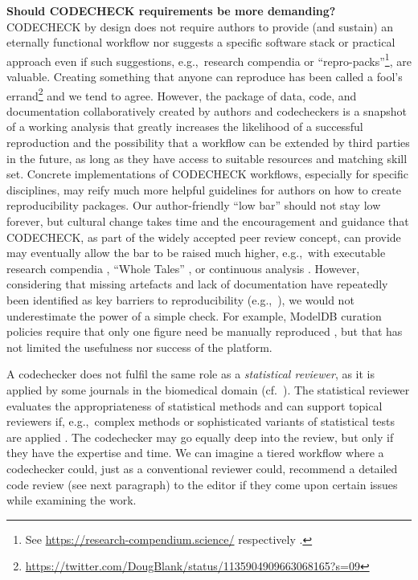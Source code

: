 \documentclass[12pt]{article}
\begin{document}
\textbf{Should CODECHECK requirements be more demanding?} \\
CODECHECK by design does not require authors to provide (and sustain)
an eternally functional workflow nor suggests a specific software
stack or practical approach even if such suggestions, e.g.,~research
compendia or ``repro-packs''\footnote{See
  \url{https://research-compendium.science/} respectively
  \cite{barba_praxis_2018}.}, are valuable.  Creating something
that anyone can reproduce has been called a fool's
errand\footnote{\url{https://twitter.com/DougBlank/status/1135904909663068165?s=09}}
and we tend to agree.  However, the package of data, code, and
documentation collaboratively created by authors and codecheckers is a
snapshot of a working analysis that greatly increases the likelihood
of a successful reproduction and the possibility that a workflow can
be extended by third parties in the future, as long as they have
access to suitable resources and matching skill set.  Concrete
implementations of CODECHECK workflows, especially for specific
disciplines, may reify much more helpful guidelines for authors on how
to create reproducibility packages.  Our author-friendly ``low bar''
should not stay low forever, but cultural change takes time and the
encouragement and guidance that CODECHECK, as part of the widely
accepted peer review concept, can provide may eventually allow the bar
to be raised much higher, e.g.,~with executable research
compendia \cite{nust_opening_2017}, ``Whole Tales''
\cite{brinckman_computing_2018}, or continuous analysis
\cite{beaulieu-jones_reproducibility_2017-1}.  However, considering
that missing artefacts and lack of documentation have repeatedly been
identified as key barriers to reproducibility
(e.g.,~\cite{stagge_assessing_2019,nust_improving_2020}), we would not
underestimate the power of a simple check.  For example, ModelDB
curation policies require that only one figure need be manually reproduced
\cite{mcdougal_reproducibility_2016}, but that has not limited the
usefulness nor success of the platform.

A codechecker does not fulfil the same role as a \emph{statistical
  reviewer}, as it is applied by some journals in the biomedical
domain (cf.~\cite{petrovecki_role_2009,greenwood_how_2015}).  The
statistical reviewer evaluates the appropriateness of statistical
methods \cite{greenwood_how_2015} and can support topical reviewers
if, e.g.,~complex methods or sophisticated variants of statistical
tests are applied \cite{petrovecki_role_2009}.  The codechecker may go
equally deep into the review, but only if they have the expertise and
time. We can imagine a tiered workflow where a codechecker could, just
as a conventional reviewer could, recommend a detailed code review
(see next paragraph) to the editor if they come upon certain issues while
examining the work.
\end{document}

